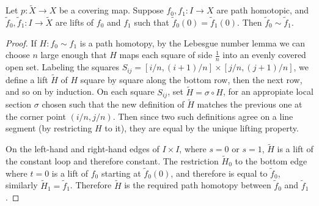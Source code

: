 \begin{prop}
    Let $p \colon \widetilde X \to X$ be a covering map. Suppose $f_0,f_1 \colon I \to X$ are path homotopic, and $\widetilde f_0,\widetilde f_1 \colon I \to \widetilde X$ are lifts of $f_0$ and $f_1$ such that $\widetilde f_0(0)=\widetilde f_1(0)$. Then $\widetilde f_0 \sim \widetilde f_1$. 
\end{prop}
\begin{proof}
    If $H \colon f_0 \sim f_1$ is a path homotopy, by the Lebesgue number lemma we can choose $n$ large enough that $H$ maps each square of side $\frac{1}{n}$ into an evenly covered open set. Labeling the squares $S_{ij}=[i /n,(i+1)/n]\times [j /n,(j+1)/n]$, we define a lift $\widetilde H$ of $H$ square by square along the bottom row, then the next row, and so on by induction. On each square $S_{ij}$, set $\widetilde H=\sigma \circ H$, for an appropiate local section $\sigma$ chosen such that the new definition of $\widetilde H$ matches the previous one at the corner point $(i /n,j /n)$. Then since two such definitions agree on a line segment (by restricting $H$ to it), they are equal by the unique lifting property.

    On the left-hand and right-hand edges of $I\times I$, where $s=0$ or $s=1$, $\widetilde H$ is a lift of the constant loop and therefore constant. The restriction $\widetilde H_0$ to the bottom edge where $t=0$ is a lift of $f_0$ starting at $\widetilde f_0(0)$, and therefore is equal to $\widetilde f_0$, similarly $\widetilde H_1=\widetilde f_1$. Therefore $\widetilde H$ is the required path homotopy between $\widetilde f_0$ and $\widetilde f_1$.
\end{proof}

